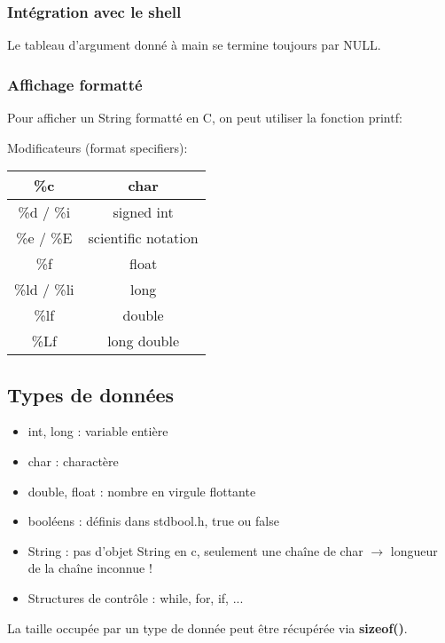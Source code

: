 \documentclass{article}
\newcommand{\insertslide}[2]{
\begin{center}
    \fbox{\texttt{[image: \#1]}}
\end{center}
}
\begin{document}
        \subsubsection{Intégration avec le shell}
            \insertslide{Slides/CM2.pdf}{15}
            Le tableau d'argument donné à main se termine toujours par NULL.
        
        \subsubsection{Affichage formatté}
            Pour afficher un String formatté en C, on peut utiliser la fonction printf:
            \insertslide{Slides/CM2.pdf}{16}
            Modificateurs (format specifiers):\\
            \begin{center}
                \begin{tabular}{|c|c|}
                    \hline
                    \%c & char \\
                    \hline
                    \%d / \%i & signed int \\
                    \hline
                    \%e / \%E & scientific notation \\
                    \hline
                    \%f & float \\
                    \hline
                    \%ld / \%li & long \\
                    \hline
                    \%lf & double \\
                    \hline
                    \%Lf & long double \\
                    \hline
                \end{tabular}
            \end{center}
    \subsection{Types de données}
        \begin{itemize}
            \item int, long : variable entière
            \item char : charactère
            \item double, float : nombre en virgule flottante
            \item booléens : définis dans stdbool.h, true ou false
            \item String : pas d'objet String en c, 
            seulement une chaîne de char $\rightarrow$ longueur de la chaîne inconnue !
            \item Structures de contrôle : while, for, if, ...
        \end{itemize}
        La taille occupée par un type de donnée peut être récupérée via \textbf{sizeof()}.
\end{document}
